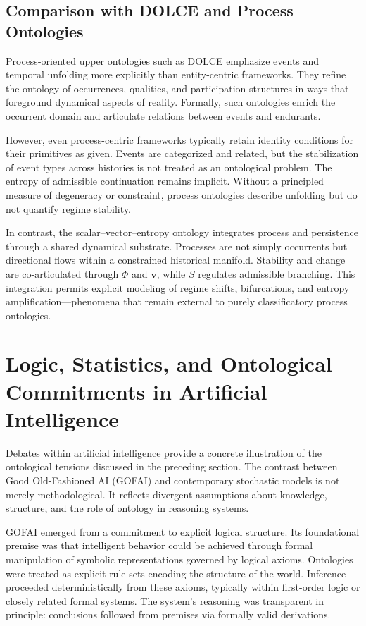 \documentclass[12pt]{article}
\begin{document}
\subsection{Comparison with DOLCE and Process Ontologies}

Process-oriented upper ontologies such as DOLCE emphasize events and temporal unfolding more explicitly than entity-centric frameworks. They refine the ontology of occurrences, qualities, and participation structures in ways that foreground dynamical aspects of reality. Formally, such ontologies enrich the occurrent domain and articulate relations between events and endurants.

However, even process-centric frameworks typically retain identity conditions for their primitives as given. Events are categorized and related, but the stabilization of event types across histories is not treated as an ontological problem. The entropy of admissible continuation remains implicit. Without a principled measure of degeneracy or constraint, process ontologies describe unfolding but do not quantify regime stability.

In contrast, the scalar–vector–entropy ontology integrates process and persistence through a shared dynamical substrate. Processes are not simply occurrents but directional flows within a constrained historical manifold. Stability and change are co-articulated through $\Phi$ and $\mathbf{v}$, while $S$ regulates admissible branching. This integration permits explicit modeling of regime shifts, bifurcations, and entropy amplification—phenomena that remain external to purely classificatory process ontologies.

\section{Logic, Statistics, and Ontological Commitments in Artificial Intelligence}

Debates within artificial intelligence provide a concrete illustration of the ontological tensions discussed in the preceding section. The contrast between Good Old-Fashioned AI (GOFAI) and contemporary stochastic models is not merely methodological. It reflects divergent assumptions about knowledge, structure, and the role of ontology in reasoning systems.

GOFAI emerged from a commitment to explicit logical structure. Its foundational premise was that intelligent behavior could be achieved through formal manipulation of symbolic representations governed by logical axioms. Ontologies were treated as explicit rule sets encoding the structure of the world. Inference proceeded deterministically from these axioms, typically within first-order logic or closely related formal systems. The system’s reasoning was transparent in principle: conclusions followed from premises via formally valid derivations.
\end{document}
